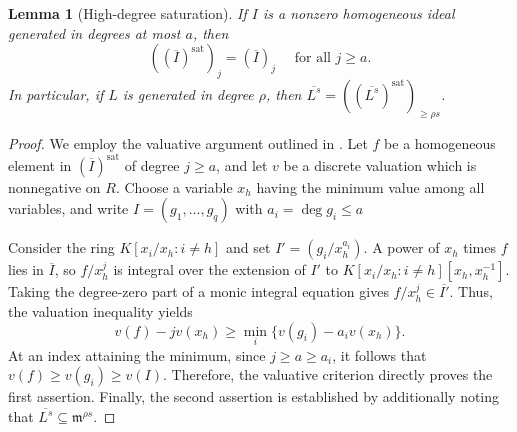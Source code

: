 \documentclass[12pt]{amsart}
\numberwithin{equation}{section}
\newtheorem{lemma}[theorem]{Lemma}
\theoremstyle{definition}
\theoremstyle{remark}
\numberwithin{equation}{section}
\begin{document}
\begin{lemma}[High-degree saturation]\label{lem:normal-saturation}
	If $I$ is a nonzero homogeneous ideal generated in degrees at most $a$, then
	\[
	((\overline{I})^{\mathrm{sat}})_j = (\overline{I})_j \quad  \text{ for all $j\ge  a$}.
	\]
	In particular, if $L$ is generated in degree $\rho$, then $\overline{L^s} = ((\overline{L^s})^{\mathrm{sat}})_{\ge \rho s}$.
\end{lemma}
\begin{proof}
We employ the valuative argument outlined in \cite[Lemma 3.6]{Misra}. Let $f$ be a homogeneous element in $(\overline{I})^{\mathrm{sat}}$ of degree $j \ge a$, and let $v$ be a discrete valuation which is nonnegative on $R$. Choose a variable $x_h$ having the minimum value among all variables, and write $I = (g_1, \dots, g_q)$ with $a_i = \deg g_i \le a$
	
	Consider the  ring $K[x_i/x_h : i \neq h]$ and set $I' = (g_i/x_h^{a_i})$.  A power of $x_h$ times $f$ lies in $\overline I$, so $f/x_h^j$ is integral over the extension of $I'$ to $K[x_i/x_h:i\ne h][x_h,x_h^{-1}]$. Taking the degree-zero part of a monic integral equation gives $f/x_h^j\in\overline{I'}$. Thus, the valuation inequality yields
	\[
	v(f) - jv(x_h) \ge \min_i \{v(g_i) - a_i v(x_h)\}.
	\]
	At an index attaining the minimum, since $j \ge a \ge a_i$, it follows that $v(f) \ge v(g_i) \ge v(I)$. Therefore, the valuative criterion directly proves the first assertion. Finally, the second assertion is established by additionally noting that $\overline{L^s} \subseteq \mathfrak{m}^{\rho s}$.
\end{proof}
\end{document}
